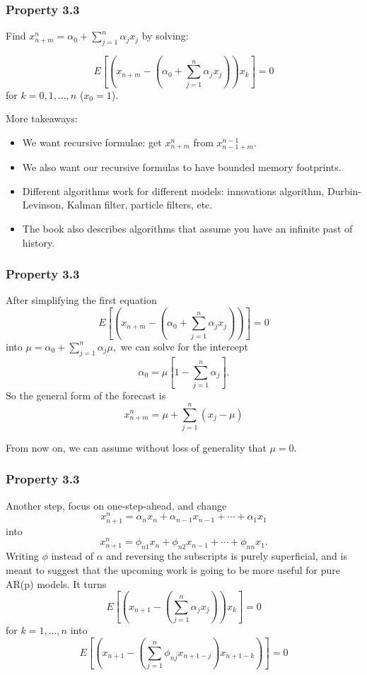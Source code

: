 \documentclass[%
xcolor=pdftex]{beamer}
\begin{document}
\begin{frame}
\frametitle{Property 3.3}

Find $x_{n+m}^n = \alpha_0 + \sum_{j=1}^n \alpha_j x_j$ by solving: 

$$
E\left[ \left(x_{n+m} - \left( \alpha_0 + \sum_{j=1}^n \alpha_j x_j\right) \right)x_k \right] = 0 
$$
for $k=0,1,\ldots, n$ ($x_0 = 1$).

More takeaways:

\begin{itemize}
\item We want recursive formulae: get $x_{n+m}^n$ from $x_{n-1+m}^{n-1}$.
\item We also want our recursive formulas to have bounded memory footprints.
\item Different algorithms work for different models: innovations algorithm, Durbin-Levinson, Kalman filter, particle filters, etc.
\item The book also describes algorithms that assume you have an infinite past of history.
\end{itemize}

\end{frame}




\begin{frame}
\frametitle{Property 3.3}

After simplifying the first equation
$$
E\left[ \left(x_{n+m} - \left( \alpha_0 + \sum_{j=1}^n \alpha_j x_j\right) \right) \right] = 0
$$
into $\mu = \alpha_0 + \sum_{j=1}^n \alpha_j \mu,$ we can solve for the intercept
$$
\alpha_0 = \mu\left[1 - \sum_{j=1}^n \alpha_j \right].
$$
So the general form of the forecast is 
$$
x_{n+m}^n = \mu + \sum_{j=1}^n (x_j - \mu)
$$

From now on, we can assume without loss of generality that $\mu = 0$.
\end{frame}


\begin{frame}
\frametitle{Property 3.3}

Another step, focus on one-step-ahead, and change 
$$
x_{n+1}^n = \alpha_n x_n + \alpha_{n-1}x_{n-1} + \cdots + \alpha_1 x_1
$$
into
$$
x_{n+1}^n = \phi_{n1} x_n + \phi_{n2}x_{n-1} + \cdots + \phi_{nn} x_1.
$$
Writing $\phi$ instead of $\alpha$ and reversing the subscripts is purely superficial, and is meant to suggest that the upcoming work is going to be more useful for pure AR(p) models. It turns 
$$
E\left[ \left(x_{n+1} - \left( \sum_{j=1}^n \alpha_j x_j\right) \right)x_k \right] = 0
$$
for $k=1,\ldots,n$ into 
$$
E\left[ \left(x_{n+1} - \left( \sum_{j=1}^n \phi_{nj} x_{n+1-j}\right)x_{n+1-k} \right) \right] = 0
$$


\end{frame}
\end{document}
